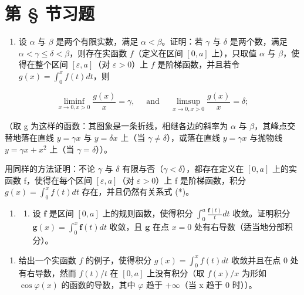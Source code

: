 \section*{第 \S{} 节习题}
{}

\begin{enumerate}
\def\labelenumi{\arabic{enumi})}
\tightlist
\item
  设 \(\alpha\) 与 \(\beta\) 是两个有限实数，满足 \(\alpha < \beta\)。证明：若 \(\gamma\) 与 \(\delta\) 是两个数，满足 \(\alpha < \gamma \leqslant \delta < \beta\)，则存在实函数 \(f\)（定义在区间 \([0, a]\) 上），只取值 \(\alpha\) 与 \(\beta\)，使得在整个区间 \([\varepsilon, a]\)（对 \(\varepsilon > 0\)）上 \(f\) 是阶梯函数，并且若令 \(g(x) = \int_0^x f(t)dt\)，则
\end{enumerate}

\[
\liminf _ {x \to 0,   x > 0} \frac {g (x)}{x} = \gamma , \quad \text { and } \quad \limsup _ {x \to 0,   x > 0} \frac {g (x)}{x} = \delta ;\tag{*}
\]

（取 g 为这样的函数：其图象是一条折线，相继各边的斜率为 \(\alpha\) 与 \(\beta\)，其峰点交替地落在直线 \(y = \gamma x\) 与 \(y = \delta x\) 上（当 \(\gamma \neq \delta\)），或落在直线 \(y = \gamma x\) 与抛物线 \(y = \gamma x + x^{2}\) 上（当 \(\gamma = \delta\)））。

用同样的方法证明：不论 \(\gamma\) 与 \(\delta\) 有限与否（\(\gamma < \delta\)），都存在定义在 \([0, a]\) 上的实函数 f，使得在每个区间 \([\varepsilon, a]\)（对 \(\varepsilon > 0\)）上 f 是阶梯函数，积分 \(g(x) = \int_{0}^{x} f(t) dt\) 存在，并且仍然有关系式 (*)。

\begin{enumerate}
\def\labelenumi{\arabic{enumi})}
\setcounter{enumi}{1}
\tightlist
\item
  \begin{enumerate}
  \def\labelenumii{\alph{enumii})}
  \tightlist
  \item
    设 \(\mathbf{f}\) 是区间 \([0, a]\) 上的规则函数，使得积分 \(\int_0^a \frac{\mathbf{f}(t)}{t} dt\) 收敛。证明积分 \(\mathbf{g}(x) = \int_0^x \mathbf{f}(t) dt\) 收敛，且 \(\mathbf{g}\) 在点 \(x = 0\) 处有右导数（适当地分部积分）。
  \end{enumerate}
\end{enumerate}

\begin{enumerate}
\def\labelenumi{\alph{enumi})}
\setcounter{enumi}{1}
\tightlist
\item
  给出一个实函数 \(f\) 的例子，使得积分 \(g(x) = \int_0^x f(t)dt\) 收敛并且在点 0 处有右导数，然而 \(f(t) / t\) 在 \([0, a]\) 上没有积分（取 \(f(x)/x\) 为形如 \(\cos\varphi(x)\) 的函数的导数，其中 \(\varphi\) 趋于 \(+\infty\)（当 x 趋于 0 时））。
\end{enumerate}

